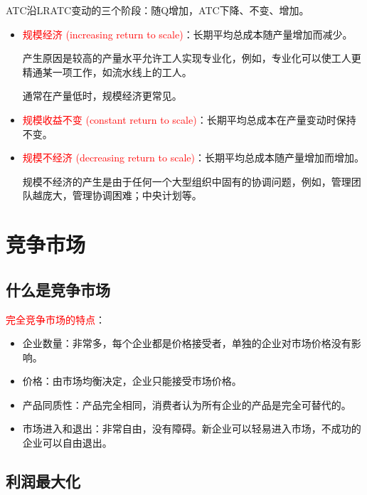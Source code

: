 \documentclass[12pt, a4paper]{article}
\begin{document}
ATC沿LRATC变动的三个阶段：随Q增加，ATC下降、不变、增加。

\begin{itemize}
  \item \textcolor{red}{规模经济 (increasing return to scale)}：长期平均总成本随产量增加而减少。 
  
  产生原因是较高的产量水平允许工人实现专业化，例如，专业化可以使工人更精通某一项工作，如流水线上的工人。 
  
  通常在产量低时，规模经济更常见。

  \item \textcolor{red}{规模收益不变 (constant return to scale)}：长期平均总成本在产量变动时保持不变。

  \item \textcolor{red}{规模不经济 (decreasing return to scale)}：长期平均总成本随产量增加而增加。 
  
  规模不经济的产生是由于任何一个大型组织中固有的协调问题，例如，管理团队越庞大，管理协调困难；中央计划等。
\end{itemize}


\newpage
\section{竞争市场}

\subsection{什么是竞争市场}

\textcolor{red}{完全竞争市场的特点}：

\begin{itemize}
  \item 企业数量：非常多，每个企业都是价格接受者，单独的企业对市场价格没有影响。

  \item 价格：由市场均衡决定，企业只能接受市场价格。

  \item 产品同质性：产品完全相同，消费者认为所有企业的产品是完全可替代的。
  
  \item 市场进入和退出：非常自由，没有障碍。新企业可以轻易进入市场，不成功的企业可以自由退出。
\end{itemize}

\subsection{利润最大化}
\end{document}
